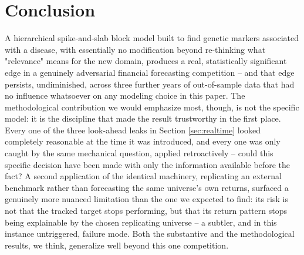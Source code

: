 \documentclass[11pt]{article}
\begin{document}
\section{Conclusion}
\label{sec:conclusion}

A hierarchical spike-and-slab block model built to find genetic markers
associated with a disease, with essentially no modification beyond re-thinking
what "relevance" means for the new domain, produces a real, statistically
significant edge in a genuinely adversarial financial forecasting competition
-- and that edge persists, undiminished, across three further years of
out-of-sample data that had no influence whatsoever on any modeling choice in
this paper. The methodological contribution we would emphasize most, though,
is not the specific model: it is the discipline that made the result
trustworthy in the first place. Every one of the three look-ahead leaks in
Section \ref{sec:realtime} looked completely reasonable at the time it was
introduced, and every one was only caught by the same mechanical question,
applied retroactively -- could this specific decision have been made with only
the information available before the fact? A second application of the
identical machinery, replicating an external benchmark rather than forecasting
the same universe's own returns, surfaced a genuinely more nuanced limitation
than the one we expected to find: its risk is not that the tracked target
stops performing, but that its return pattern stops being explainable by the
chosen replicating universe -- a subtler, and in this instance untriggered,
failure mode. Both the substantive and the methodological results, we think,
generalize well beyond this one competition.



\end{document}
